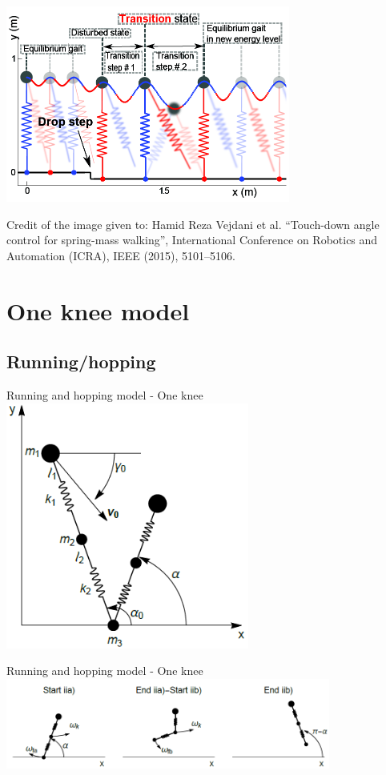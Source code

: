 \documentclass{beamer}
\begin{document}
\begin{frame}
  \centering
  \includegraphics[width=0.7\textwidth]{AdaptiveSteps.png}

  Credit of the image given to: Hamid Reza Vejdani et al. “Touch-down angle control for spring-mass walking”,
International Conference on Robotics and Automation (ICRA), IEEE (2015), 5101–5106.
  \end{frame}

\section{One knee model}
\subsection{Running/hopping}
\begin{frame}{Running and hopping model - One knee}
  \centering
    \includegraphics[width=0.6\textwidth]{initialphase.png}
\end{frame}


\begin{frame}{Running and hopping model - One knee}
  \centering
    \includegraphics[width=0.8\textwidth]{secondphase.png}
\end{frame}
\end{document}
